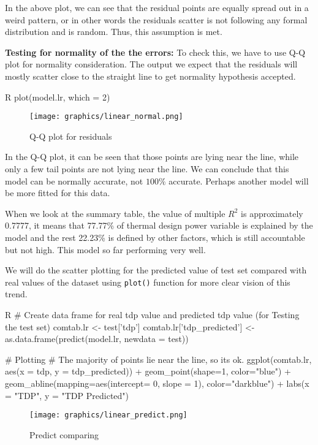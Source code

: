 In the above plot, we can see that the residual points are equally spread out in a weird pattern, or in other words the residuals scatter is not following any formal distribution and is random. Thus, this assumption is met.

\textbf{Testing for normality of the the errors:} To check this, we have to use Q-Q plot for normality consideration. The output we expect that the residuals will mostly scatter close to the straight line to get normality hypothesis accepted.
\begin{code}{R}
plot(model.lr, which = 2)
\end{code}
\begin{figure}[H]
    \centering
    \texttt{[image: graphics/linear\_normal.png]}
    \caption{Q-Q plot for residuals}
    \label{fig:33}
\end{figure}

In the Q-Q plot, it can be seen that those points are lying near the line, while only a few tail points are not lying near the line. We can conclude that this model can be normally accurate, not $100\%$ accurate. Perhaps another model will be more fitted for this data.

When we look at the summary table, the value of multiple $R^2$ is approximately 0.7777, it means that 77.77\% of thermal design power variable is explained by the model and the rest 22.23\% is defined by other factors, which is still accountable but not high. This model so far performing very well.

We will do the scatter plotting for the predicted value of test set compared with real values of the dataset using \verb|plot()| function for more clear vision of this trend.
\begin{code}{R}
# Create data frame for real tdp value and predicted tdp value (for Testing the test set)
comtab.lr <- test['tdp']
comtab.lr['tdp_predicted'] <- as.data.frame(predict(model.lr, newdata = test))

# Plotting
# The majority of points lie near the line, so its ok.
ggplot(comtab.lr, aes(x = tdp, y = tdp_predicted)) +
  geom_point(shape=1, color="blue") +
  geom_abline(mapping=aes(intercept= 0, slope = 1), color="darkblue") +
  labs(x = "TDP", y = "TDP Predicted")
\end{code}
\begin{figure}[H]
    \centering
    \texttt{[image: graphics/linear\_predict.png]}
    \caption{Predict comparing}
    \label{fig:34}
\end{figure}

